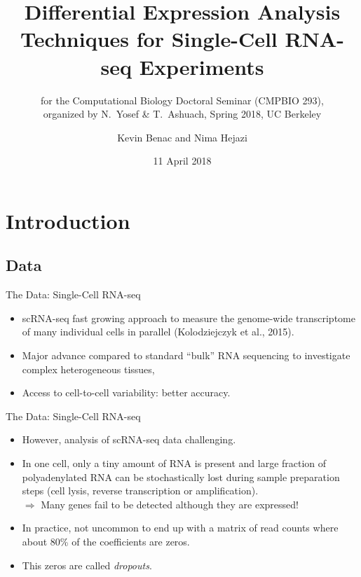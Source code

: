 \documentclass{beamer}
\title[zinbwave-droplasso]{Differential Expression Analysis Techniques for
  Single-Cell RNA-seq Experiments}
\subtitle{\vspace*{0.5em} \scriptsize for the Computational Biology Doctoral
  Seminar (CMPBIO 293),\\ organized by N.~Yosef \& T.~Ashuach, Spring 2018, UC
  Berkeley}
\author{Kevin Benac and Nima Hejazi}
\institute{Group in Biostatistics,\\ University of California, Berkeley}
\date{11 April 2018}
\begin{document}
\begin{frame}
  \titlepage
\end{frame}

\section{Introduction}
\subsection{Data}

\begin{frame}{The Data: Single-Cell RNA-seq}
\begin{itemize}
  \itemsep10pt
  \item scRNA-seq fast growing approach to measure the genome-wide transcriptome of many individual cells in parallel (Kolodziejczyk et al., 2015).
  \item Major advance compared to standard “bulk” RNA sequencing to investigate complex heterogeneous tissues,
  \item Access to cell-to-cell variability: better accuracy.
\end{itemize}

\end{frame}


\begin{frame}{The Data: Single-Cell RNA-seq}

\begin{itemize}
  \itemsep10pt
  \item However, analysis of scRNA-seq data challenging.
  \item In one cell, only a tiny amount of RNA is present and large fraction of polyadenylated RNA can be stochastically lost during sample preparation steps (cell lysis, reverse transcription or amplification). \\
 $ \Longrightarrow$ Many genes fail to be detected although they are expressed!
  \item In practice, not uncommon to end up with a matrix of read counts where about 80\% of the coefficients are zeros.
  \item This zeros are called \textit{dropouts}.
\end{itemize}

\end{frame}
\end{document}
